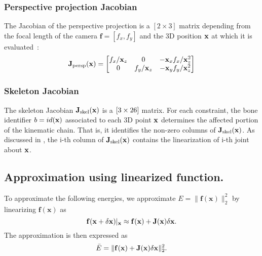 \subsubsection*{Perspective projection Jacobian} 
The  Jacobian of the perspective projection is a $[2\times3]$ matrix depending from the focal length of the camera $\mathbf{f}=[f_x, f_y]$ and the 3D position $\mathbf{x}$ at which it is evaluated~\cite{Bouaziz_eg2014}:
\begin{equation*}
    \mathbf{J}_{\text{persp}}(\mathbf{x}) = 
    \left[
    \begin{matrix}
        f_x/\mathbf{x}_z & 0   & -\mathbf{x}_x f_x / \mathbf{x}_z^2 \\
        0   & f_y/\mathbf{x}_z & -\mathbf{x}_y f_y / \mathbf{x}_z^2 \\
    \end{matrix}
    \right]
\end{equation*}
% 
% 
%  
% 
%  
\subsubsection*{Skeleton Jacobian} The skeleton Jacobian $\mathbf{J}_{\text{skel}}(\mathbf{x})$ is a $[3\times26]$ matrix. For each constraint, the bone identifier $b=id(\mathbf{x})$ associated to each 3D point $\mathbf{x}$ determines the affected portion of the kinematic chain. That is, it identifies the non-zero columns of $\mathbf{J}_{\text{skel}}(\mathbf{x})$. As discussed in \cite{buss2004introduction}, the i-th column of $\mathbf{J}_{\text{skel}}(\mathbf{x})$ contains the linearization of i-th joint about $\mathbf{x}$.
% 
% 
%  
% 
%  
\vspace{-.15in}
\subsection{Approximation using linearized function.}
\label{app:linfunction}
To approximate the following energies, we approximate $E=\|\mathbf{f}(\mathbf{x})\|_2^2$ by linearizing $\mathbf{f}(\mathbf{x})$ as
\begin{equation*}
\mathbf{f}(\mathbf{x}+\delta\mathbf{x})|_{\mathbf{x}} \approx \mathbf{f}(\mathbf{x}) + \mathbf{J}(\mathbf{x})\delta\mathbf{x}.
\end{equation*}
The approximation is then expressed as 
\begin{equation}
\label{eq:linearization}
\bar{E} = \|\mathbf{f}(\mathbf{x}) + \mathbf{J}(\mathbf{x})\delta\mathbf{x}\|_2^2.
\end{equation}
